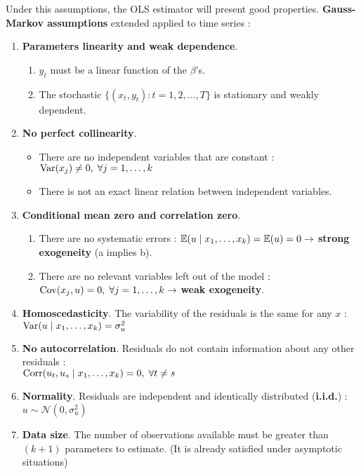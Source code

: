  \begin{f}

Under this assumptions, the OLS estimator will present good properties. \textbf{Gauss-Markov assumptions} extended applied to time series :

\begin{enumerate}[leftmargin=*, label=t\arabic{*}.]
	\item \textbf{Parameters linearity and weak dependence}.
	
	\begin{enumerate}[leftmargin=*, label=\alph{*}.]
		\item \(y_{t}\) must be a linear function of the \(\beta\)'s.
		\item The stochastic \(\lbrace( x_{t}, y_{t}) : t = 1, 2, \ldots, T \rbrace\) is stationary and weakly dependent.
	\end{enumerate}
	
	\item \textbf{No perfect collinearity}.
	
	\begin{itemize}[leftmargin=*]
		\item There are no independent variables that are constant : \(\mathrm{Var}(x_{j}) \neq 0, \; \forall j = 1, \ldots, k\)
		\item There is not an exact linear relation between independent variables.
	\end{itemize}
	
	\item \textbf{Conditional mean zero and correlation zero}.
	
	\begin{enumerate}[leftmargin=*, label=\alph{*}.]
		\item There are no systematic errors : \(\mathbb{E}(u \mid x_{1}, \ldots, x_{k}) = \mathbb{E}(u) = 0 \rightarrow\) \textbf{strong exogeneity} (a implies b).
		\item There are no relevant variables left out of the model : \(\mathrm{Cov}(x_{j} , u) = 0, \; \forall j = 1, \ldots, k \rightarrow\) \textbf{weak exogeneity}.
	\end{enumerate}
	
	\item \textbf{Homoscedasticity}. The variability of the residuals is the same for any \(x\) : \(\mathrm{Var}(u \mid x_{1}, \ldots, x_{k}) = \sigma^{2}_{u}\)
	\item \textbf{No autocorrelation}. Residuals do not contain information about any other residuals : \\
	\(\mathrm{Corr}(u_{t}, u_{s} \mid x_{1}, \ldots, x_{k}) = 0, \; \forall t \neq s\)
	\item \textbf{Normality}. Residuals are independent and identically distributed (\textbf{i.i.d.}) : \(u \sim \mathcal{N}(0, \sigma^{2}_{u})\)
	\item \textbf{Data size}. The number of observations available must be greater than \((k + 1)\) parameters to estimate. (It is already satisfied under asymptotic situations)
\end{enumerate}

\end{f}    

